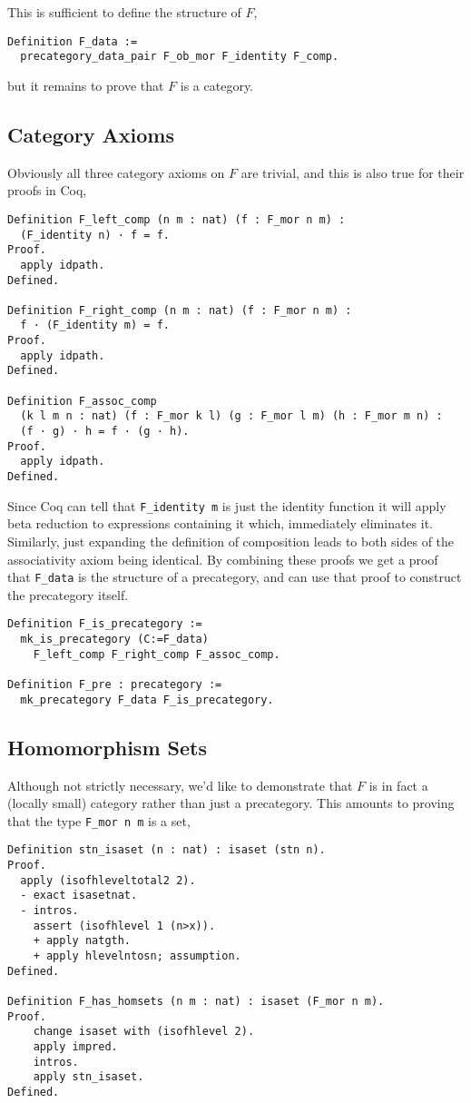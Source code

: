 This is sufficient to define the structure of $F$,
%
\begin{lstlisting}
Definition F_data := 
  precategory_data_pair F_ob_mor F_identity F_comp.
\end{lstlisting}
%
but it remains to prove that $F$ is a category.

\subsection{Category Axioms}
Obviously all three category axioms on $F$ are trivial, and this is also true
for their proofs in Coq,
\begin{lstlisting}
Definition F_left_comp (n m : nat) (f : F_mor n m) : 
  (F_identity n) · f = f.
Proof.
  apply idpath.
Defined.

Definition F_right_comp (n m : nat) (f : F_mor n m) : 
  f · (F_identity m) = f.
Proof.
  apply idpath.
Defined.

Definition F_assoc_comp 
  (k l m n : nat) (f : F_mor k l) (g : F_mor l m) (h : F_mor m n) :
  (f · g) · h = f · (g · h).
Proof.
  apply idpath.
Defined.
\end{lstlisting}

Since Coq can tell that \lstinline|F_identity m| is just the identity function it
will apply beta reduction to expressions containing it which, immediately
eliminates it. Similarly, just expanding the definition of composition leads to
both sides of the associativity axiom being identical. By combining these proofs
we get a proof that \lstinline|F_data| is the structure of a precategory, and can
use that proof to construct the precategory itself.

\begin{lstlisting}
Definition F_is_precategory := 
  mk_is_precategory (C:=F_data) 
    F_left_comp F_right_comp F_assoc_comp.

Definition F_pre : precategory := 
  mk_precategory F_data F_is_precategory.
\end{lstlisting}

\subsection{Homomorphism Sets}
Although not strictly necessary, we'd like to demonstrate that $F$ is in fact a
(locally small) category rather than just a precategory. This amounts to proving
that the type \lstinline|F_mor n m| is a set,

\begin{lstlisting}
Definition stn_isaset (n : nat) : isaset (stn n).
Proof.
  apply (isofhleveltotal2 2).
  - exact isasetnat.
  - intros.
    assert (isofhlevel 1 (n>x)).
    + apply natgth.
    + apply hlevelntosn; assumption.
Defined.

Definition F_has_homsets (n m : nat) : isaset (F_mor n m).
Proof.
    change isaset with (isofhlevel 2).
    apply impred.
    intros.
    apply stn_isaset.
Defined.
\end{lstlisting}

